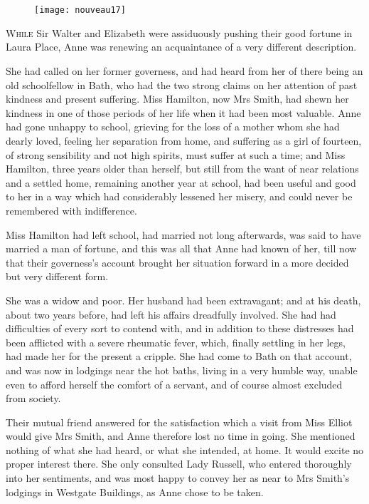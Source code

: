 \chapter[Chapter \thechapter]{}

\begin{figure}[t!]
\centering
\texttt{[image: nouveau17]}
\end{figure}

\lettrine[lraise=0.3]{W}{hile} Sir Walter and Elizabeth were assiduously pushing their good fortune in Laura Place, Anne was renewing an acquaintance of a very different description.

She had called on her former governess, and had heard from her of there being an old schoolfellow in Bath, who had the two strong claims on her attention of past kindness and present suffering. Miss Hamilton, now Mrs Smith, had shewn her kindness in one of those periods of her life when it had been most valuable. Anne had gone unhappy to school, grieving for the loss of a mother whom she had dearly loved, feeling her separation from home, and suffering as a girl of fourteen, of strong sensibility and not high spirits, must suffer at such a time; and Miss Hamilton, three years older than herself, but still from the want of near relations and a settled home, remaining another year at school, had been useful and good to her in a way which had considerably lessened her misery, and could never be remembered with indifference.

Miss Hamilton had left school, had married not long afterwards, was said to have married a man of fortune, and this was all that Anne had known of her, till now that their governess's account brought her situation forward in a more decided but very different form.

She was a widow and poor. Her husband had been extravagant; and at his death, about two years before, had left his affairs dreadfully involved. She had had difficulties of every sort to contend with, and in addition to these distresses had been afflicted with a severe rheumatic fever, which, finally settling in her legs, had made her for the present a cripple. She had come to Bath on that account, and was now in lodgings near the hot baths, living in a very humble way, unable even to afford herself the comfort of a servant, and of course almost excluded from society.

Their mutual friend answered for the satisfaction which a visit from Miss Elliot would give Mrs Smith, and Anne therefore lost no time in going. She mentioned nothing of what she had heard, or what she intended, at home. It would excite no proper interest there. She only consulted Lady Russell, who entered thoroughly into her sentiments, and was most happy to convey her as near to Mrs Smith's lodgings in Westgate Buildings, as Anne chose to be taken.

